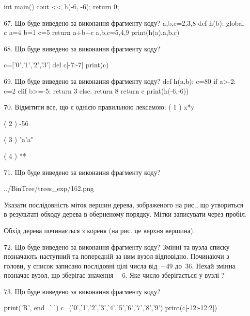 \documentclass[11pt]{article}
\begin{document}
int main(){
    cout << h(-6, -6);
    return 0;
}


67. Що буде виведено за виконання фрагменту коду?
a,b,c=2,3,8
   def h(b):
     global c     a=4
     b=1
     c=5
     return a+b+c
   a,b,c=5,4,9
   print(h(a),a,b,c)

68. Що буде виведено за виконання фрагменту коду?

c=['0','1','2','3']
del c[-7:-7]
print(c)



69. Що буде виведено за виконання фрагменту коду?
def h(a,b):
      c=80
      if a>-2: c=2
      elif b>=-5: return 3
      else: return 8
      return c
   print(h(-6,-6))

70. %
Відмітити все, що є однією правильною лексемою:
( 1 ) x*y

( 2 ) -56

( 3 ) "a'a"

( 4 ) **


71. Що буде виведено за виконання фрагменту коду?

\begin{center}
	{../BinTree/trees_exp/162.png}
\end{center}
Указати послідовність міток вершин дерева, зображеного на рис., що утвориться в результаті обходу дерева в оберненому порядку. Мітки записувати через пробіл.\par Обхід дерева починається з кореня (на рис. це верхня вершина).


72. Що буде виведено за виконання фрагменту коду?
Змінні  та  вузла списку позначають наступний та попередній за ним вузол відповідно. Починаючи з голови, у список записано послідовні цілі числа від~$-49$ до~$36$. Нехай змінна  позначає вузол, що зберігає значення~$-6$.
Яке число зберігається у вузлі  ?


73. Що буде виведено за виконання фрагменту коду?

print('R', end=' ')
c=('0','1','2','3','4','5','6','7','8','9')
print(c[-12:-12:2])


\end{document}
